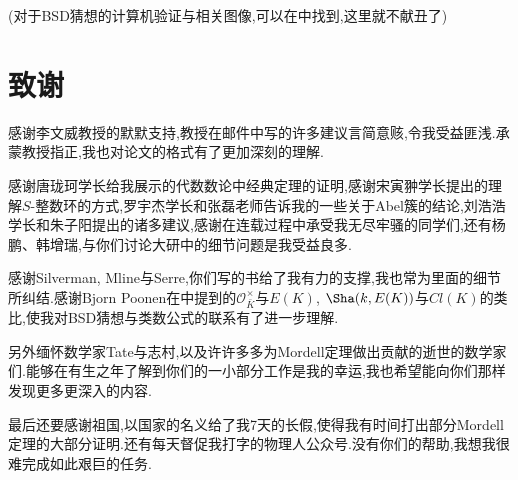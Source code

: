 \documentclass[12pt,A4paper,oneside,reqno]{amsart}
\numberwithin{equation}{section}
\theoremstyle{definition}
\theoremstyle{plain}
\theoremstyle{plain}
\numberwithin{equation}{section}
\theoremstyle{remark}
\begin{document}
(对于BSD猜想的计算机验证与相关图像,可以在\cite{johnson2015introduction}中找到,这里就不献丑了)


\section{致谢}
感谢李文威教授的默默支持,教授在邮件中写的许多建议言简意赅,令我受益匪浅.承蒙教授指正,我也对论文的格式有了更加深刻的理解.

感谢唐珑珂学长给我展示的代数数论中经典定理的证明,感谢宋寅翀学长提出的理解$S$-整数环的方式,罗宇杰学长和张磊老师告诉我的一些关于Abel簇的结论,刘浩浩学长和朱子阳提出的诸多建议,感谢在连载过程中承受我无尽牢骚的同学们,还有杨鹏、韩增瑞,与你们讨论大研中的细节问题是我受益良多.

感谢Silverman, Mline与Serre,你们写的书\cite{tate1974the,milne2006elliptic,serre1989lectures}给了我有力的支撑,我也常为里面的细节所纠结.感谢Bjorn Poonen在\cite{poonen1999selmer}中提到的$\mathcal{O}_{\bar{K}}^{\times}$与$E(K)$, $\Sha(k,E(K))$与$Cl(K)$的类比,使我对BSD猜想与类数公式的联系有了进一步理解.

另外缅怀数学家Tate与志村,以及许许多多为Mordell定理做出贡献的逝世的数学家们.能够在有生之年了解到你们的一小部分工作是我的幸运,我也希望能向你们那样发现更多更深入的内容.

最后还要感谢祖国,以国家的名义给了我7天的长假,使得我有时间打出部分Mordell定理的大部分证明.还有每天督促我打字的物理人公众号.没有你们的帮助,我想我很难完成如此艰巨的任务.

\nocite{milne1986abelian,milne1986jacobian,milne2005introduction}
\nocite{cassels1986mordell,coates2016conjecture,li2000birch,miller2011proving,poonen1999selmer,silverman1992rational,zagier1984series}






\renewcommand\refname{{\textbf{参考文献}}}
	





\end{document}
